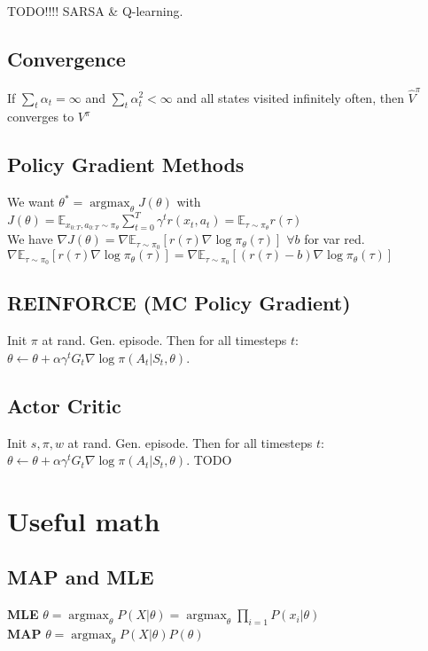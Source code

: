 \documentclass[11pt]{article}
\newcommand{\argmax}{\operatorname{argmax}}
\newcommand{\E}{\mathbb{E}}
\begin{document}
\begin{multicols*}{3}
TODO!!!! SARSA \& Q-learning.

\subsection*{Convergence}
If $\sum_t \alpha_t = \infty$ and $\sum_t \alpha_t^2 < \infty$ and all states visited infinitely often, then $\hat{V}^\pi$ converges to $V^\pi$ 


\subsection*{Policy Gradient Methods}
We want $\theta^* = \argmax_\theta J(\theta) $ with\\
 $J(\theta) = \E_{x_{0:T},a_{0:T} \sim \pi_\theta }\sum_{t=0}^{T} \gamma^t r(x_t,a_t) = \E_{\tau \sim \pi_\theta} r(\tau)$\\
 We have $\nabla J(\theta) = \nabla \E_{\tau \sim \pi_0}[r(\tau) \nabla \log \pi_\theta (\tau)]$ $\forall b$ for var red.\\
 $\nabla \E_{\tau \sim \pi_0}[r(\tau) \nabla \log \pi_\theta (\tau)] = \nabla \E_{\tau \sim \pi_0}[(r(\tau)-b) \nabla \log \pi_\theta (\tau)]$
 
\subsection*{REINFORCE (MC Policy Gradient)}
Init $\pi$ at rand. Gen. episode. Then for all timesteps $t$: $\theta \leftarrow \theta + \alpha \gamma^t G_t \nabla \log \pi (A_t|S_t,\theta)$.

\subsection*{Actor Critic}
Init $s,\pi,w$ at rand. Gen. episode. Then for all timesteps $t$: $\theta \leftarrow \theta + \alpha \gamma^t G_t \nabla \log \pi (A_t|S_t,\theta)$. TODO



\newpage

\section*{Useful math}
\subsection*{MAP and MLE}
\textbf{MLE} $\theta = \argmax_\theta P(X|\theta) = \argmax_\theta \prod_{i=1} P(x_i|\theta)$\\
\textbf{MAP} $\theta = \argmax_\theta P(X|\theta) P(\theta)$



\end{multicols*}
\end{document}
